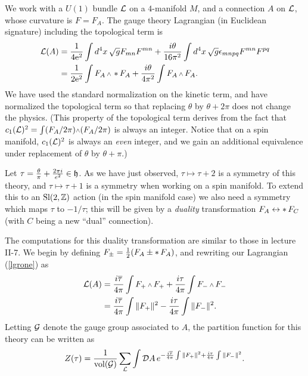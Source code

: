 We work with a $U(1)$ bundle ${\cal L}$ on a $4$-manifold $M$, and a connection
$A$ on ${\cal L}$, whose curvature is $F{=}F_A$.
The gauge theory Lagrangian (in Euclidean signature) including the
topological term is
\begin{equation}\label{lgrone}
\begin{aligned}
\lg(A) &= \frac1{4\ee^2}\int d^4x\,\sqrt{g} F_{mn}F^{mn}
+
\frac{i\theta}{16\pi^2}\int d^4x\,\sqrt{g} \epsilon_{mnpq}F^{mn}F^{pq} \\
 &=\frac1{2\ee^2}\int F_A\wdg\hstar F_A + \frac{i\theta}{4\pi^2}\int
F_A\wdg F_A .
\end{aligned}
\end{equation}
We have used the standard normalization on the kinetic term, and have
normalized the
topological term so that replacing $\theta$ by $\theta+2\pi$ does not change
the physics.  (This property of the topological term derives from the fact
that $c_1(\lb)^2=\int (F_A/2\pi)\wdg (F_A/2\pi)$ is always an integer.  Notice
that on a spin manifold,  $c_1({\cal L})^2$ is always an {\it even}\/ integer,
and we gain an additional equivalence under replacement of $\theta$ by
$\theta+\pi$.)

Let $\tau=\frac{\theta}{\pi}+\frac{2\pi i}{e^2}\in {\frak{h}}$.
As we have just observed, $\tau\mapsto\tau+2$ is a symmetry of this theory,
and $\tau\mapsto \tau+1$ is a symmetry when working on a spin manifold.
To extend this to an $\operatorname{Sl}(2,{\Bbb Z})$ action (in the spin manifold case) we
also need
a symmetry which maps $\tau$ to $-1/\tau$; this will be
given by a {\it duality}\/ transformation $F_A\leftrightarrow\mathop{*} F_C$
(with $C$ being a new ``dual'' connection).

The computations for this duality transformation are similar to those in
lecture II-7.  We begin by defining
 $F_\pm=\frac12(F_A\pm\mathop{*} F_A)$, and
rewriting our Lagrangian (\ref{lgrone}) as
\begin{equation}
\begin{aligned}
\lg(A)&=\frac{i\overline{\tau}}{4\pi}\int F_+\wdg F_+ +\frac{i\tau}{4\pi}\int
F_-\wdg F_- \\
&=\frac{i\overline{\tau}}{4\pi}\int \|F_+\|^2-\frac{i\tau}{4\pi}\int
\|F_-\|^2 .
\end{aligned}
\end{equation}
Letting ${\cal G}$ denote the gauge group associated to $A$, the partition
function for this theory can be written as
\begin{equation}
Z(\tau)=\frac1{\operatorname{\rm vol}({\cal G})}\sum_{{\cal L}}\int {\cal D} A\,
e^{-\frac{i\overline{\tau}}{4\pi}\int\| F_+\|^2
+\frac{i\tau}{4\pi}\int\| F_-\|^2} .
\end{equation}


